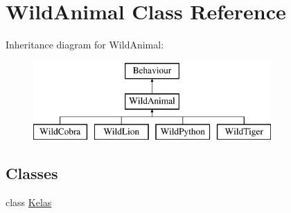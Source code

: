 \hypertarget{classWildAnimal}{\section{Wild\+Animal Class Reference}
\label{classWildAnimal}
}
Inheritance diagram for Wild\+Animal\+:\begin{figure}[H]
\begin{center}
\leavevmode
\includegraphics[height=3.000000cm]{classWildAnimal}
\end{center}
\end{figure}
\subsection*{Classes}
\begin{DoxyCompactItemize}
\item 
class \hyperlink{classWildAnimal_1_1Kelas}{Kelas}
\end{DoxyCompactItemize}
